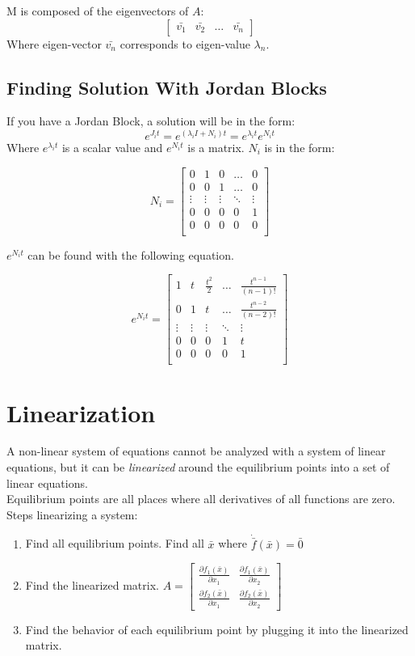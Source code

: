 \documentclass[12pt]{article}
\begin{document}
\noindent 
M is composed of the eigenvectors of $A$:
$$
\begin{bmatrix}
	\bar{v_1} & \bar{v_2} & \dots & \bar{v_n}
\end{bmatrix}
$$
\noindent
Where eigen-vector $\bar{v_n}$ corresponds to eigen-value $\lambda_n$.

\subsection*{Finding Solution With Jordan Blocks}
If you have a Jordan Block, a solution will be in the form:
$$e^{J_it}=e^{(\lambda_iI+N_i)t}=e^{\lambda_it}e^{N_it}$$
Where $e^{\lambda_it}$ is a scalar value and $e^{N_it}$ is a matrix. $N_i$ is in the form:

$$
N_i=\begin{bmatrix} 
0 & 1 & 0 & \dots & 0 \\
0 & 0 & 1 & \dots & 0 \\
\vdots & \vdots & \vdots & \ddots & \vdots \\
0 & 0 & 0 & 0 & 1 \\
0 & 0 & 0 & 0 & 0\\
\end{bmatrix}
$$

$e^{N_it}$ can be found with the following equation.

$$e^{N_it}=\begin{bmatrix} 1 & t & \frac{t^2}{2} & \dots & \frac{t^{n-1}}{(n-1)!} \\
0 & 1 & t & \dots & \frac{t^{n-2}}{(n-2)!} \\
\vdots & \vdots & \vdots & \ddots & \vdots \\
0 & 0 & 0 & 1 & t \\
0 & 0 & 0 & 0 & 1\\
\end{bmatrix}$$ 

\section*{Linearization}
A non-linear system of equations cannot be analyzed with a system of linear equations, but it can be {\em linearized} around the equilibrium points into a set of linear equations. \\
Equilibrium points are all places where all derivatives of all functions are zero. \\
Steps linearizing a system:
\begin{enumerate}
	\item Find all equilibrium points. Find all $\bar{x}$ where $\dot{\bar{f}}(\bar{x}) = \bar{0}$
	\item Find the linearized matrix. 
	$A=\begin{bmatrix}
		\frac{\partial f_1(\bar{x})}{\partial x_1} & \frac{\partial f_1(\bar{x})}{\partial x_2} \\
		\frac{\partial f_2(\bar{x})}{\partial x_1} & \frac{\partial f_2(\bar{x})}{\partial x_2}
	\end{bmatrix}$
	\item Find the behavior of each equilibrium point by plugging it into the linearized matrix.
\end{enumerate}
\end{document}
